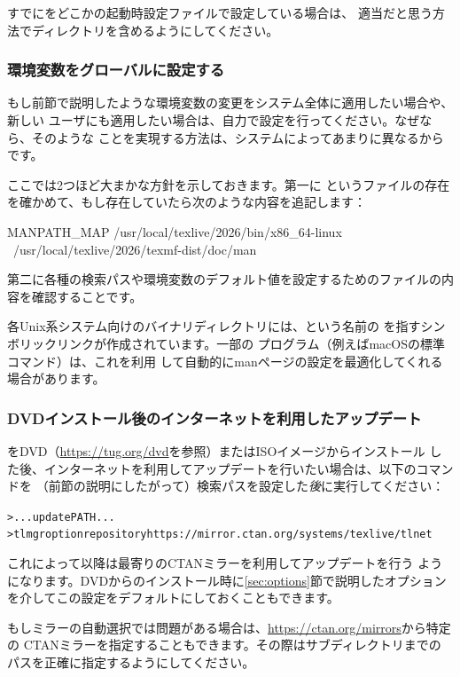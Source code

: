 \documentclass[uplatex,dvipdfmx,12pt,tombow]{jsarticle}
\begin{document}
すでにをどこかの起動時設定ファイルで設定している場合は、
適当だと思う方法で\TL ディレクトリを含めるようにしてください。

\subsubsection{環境変数をグローバルに設定する}
\label{sec:envglobal}

もし前節で説明したような環境変数の変更をシステム全体に適用したい場合や、新しい
ユーザにも適用したい場合は、自力で設定を行ってください。なぜなら、そのような
ことを実現する方法は、システムによってあまりに異なるからです。

ここでは2つほど大まかな方針を示しておきます。第一に%
というファイルの存在を確かめて、もし存在していたら次のような内容を追記します：
%
\begin{sverbatim}
MANPATH_MAP /usr/local/texlive/2026/bin/x86_64-linux \
            /usr/local/texlive/2026/texmf-dist/doc/man
\end{sverbatim}
%
第二に各種の検索パスや環境変数のデフォルト値を設定するためのファイルの内容を確認することです。

各Unix系システム向けのバイナリディレクトリには、という名前の
を指すシンボリックリンクが作成されています。一部の
プログラム（例えばmacOSの標準コマンド）は、これを利用
して自動的にmanページの設定を最適化してくれる場合があります。

\subsubsection{DVDインストール後のインターネットを利用したアップデート}
\label{sec:dvd-install-net-updates}

\TL をDVD（\url{https://tug.org/dvd}を参照）またはISOイメージからインストール
した後、インターネットを利用してアップデートを行いたい場合は、以下のコマンドを
（前節の説明にしたがって）検索パスを設定した\emph{後}に実行してください：
%
\begin{alltt}
> ... update PATH ...
> tlmgr option repository https://mirror.ctan.org/systems/texlive/tlnet
\end{alltt}
%
これによって以降は最寄りのCTANミラーを利用してアップデートを行う
ようになります。DVDからのインストール時に\ref{sec:options}節で説明したオプション
を介してこの設定をデフォルトにしておくこともできます。

もしミラーの自動選択では問題がある場合は、\url{https://ctan.org/mirrors}から特定の
CTANミラーを指定することもできます。その際はサブディレクトリまでの
パスを正確に指定するようにしてください。
\end{document}

